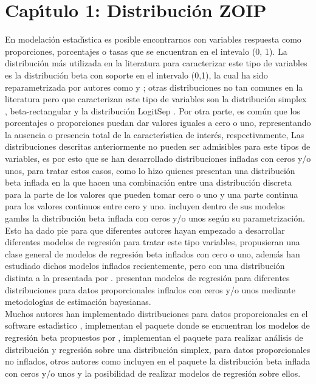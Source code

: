 \chapter{Cap\'{\i}tulo 1: Distribuci\'{o}n ZOIP}

En modelaci\'{o}n estad\'{\i}stica es posible encontrarnos con variables respuesta como proporciones, porcentajes o tasas que se encuentran en el intevalo (0, 1). La distribuci\'{o}n m\'{a}s utilizada en la literatura para caracterizar este tipo de variables es la distribuci\'{o}n beta con soporte en el intervalo (0,1), la cual ha sido reparametrizada por autores como \cite{Ferrari2} y \cite{Stasinopoulos2}; otras distribuciones no tan comunes en la literatura pero que caracterizan este tipo de variables son la distribuci\'{o}n simplex \citep{Jorgensen1}, beta-rectangular \citep{Hahn1} y la distribuci\'{o}n LogitSep \citep{Hossain1}. Por otra parte, es com\'{u}n que los porcentajes o proporciones puedan dar valores iguales a cero o uno, representando la ausencia o presencia total de la caracter\'{\i}stica de inter\'{e}s, respectivamente, Las distribuciones descritas anteriormente no pueden ser admisibles para este tipos de variables, es por esto que se han desarrollado distribuciones infladas con ceros y/o unos, para tratar estos casos, como lo hizo \cite{Ospina2} quienes presentan una distribuci\'{o}n beta inflada en la que hacen una combinaci\'{o}n entre una distribuci\'{o}n discreta para la parte de los valores que pueden tomar cero o uno y una parte continua para los valores continuos entre cero y uno. \cite{Stasinopoulos2} incluyen dentro de sus modelos gamlss la distribuci\'{o}n beta inflada con ceros y/o unos seg\'{u}n su parametrizaci\'{o}n.\\

Esto ha dado pie para que diferentes autores hayan empezado a desarrollar diferentes modelos de regresi\'{o}n para tratar este tipo variables, \cite{Ospina1} propusieran una clase general de modelos de regresi\'{o}n beta inflados con cero o uno, adem\'{a}s \cite{Kosmidis1} han estudiado dichos modelos inflados recientemente, pero con una distribuci\'{o}n distinta a la presentada por \cite{Ospina1}. \cite{Galvis1} presentan modelos de regresi\'{o}n para diferentes distribuciones para datos proporcionales inflados con ceros y/o unos mediante metodolog\'{\i}as de estimaci\'{o}n bayesianas.\\

Muchos autores han implementado distribuciones para datos proporcionales en el software estad\'{\i}stico , \cite{Zeileis1} implementan el paquete  donde se encuentran los modelos de regresi\'{o}n beta propuestos por \cite{Ferrari2}, \cite{Qiu1} implementan el paquete  para realizar an\'{a}lisis de distribuci\'{o}n y regresi\'{o}n sobre una distribuci\'{o}n simplex, para datos proporcionales no inflados, otros autores como \citep{Stasinopoulos1} incluyen en el paquete  la distribuci\'{o}n beta inflada con ceros y/o unos y la posibilidad de realizar modelos de regresi\'{o}n sobre ellos.\\

